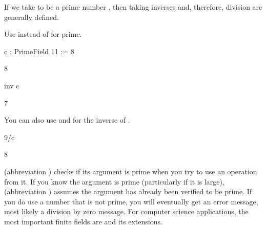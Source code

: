 {{{{{{{{{{{{{{{{If we take  to be a prime number ,
then taking inverses and, therefore, division are generally defined.
\begin{xtc}
\begin{xtccomment}
Use  instead of 
for  prime.
\end{xtccomment}
\begin{spadsrc}
c : PrimeField 11 := 8 
\end{spadsrc}
\begin{TeXOutput}
\begin{fricasmath}{6}
8%
\end{fricasmath}
\end{TeXOutput}
\end{xtc}
\begin{xtc}
\begin{xtccomment}
\end{xtccomment}
\begin{spadsrc}
inv c 
\end{spadsrc}
\begin{TeXOutput}
\begin{fricasmath}{7}
7%
\end{fricasmath}
\end{TeXOutput}
\end{xtc}
\begin{xtc}
\begin{xtccomment}
You can also use  and  for the inverse of
.
\end{xtccomment}
\begin{spadsrc}
9/c 
\end{spadsrc}
\begin{TeXOutput}
\begin{fricasmath}{8}
8%
\end{fricasmath}
\end{TeXOutput}
\end{xtc}

 (abbreviation ) checks if its
argument is prime when you try to use an operation from it.
If you know the argument is prime (particularly if it is large),
 (abbreviation ) assumes
the argument has already been verified to be prime.
If you do use a number that is not prime, you will eventually get
an error message, most likely a division by zero message.
For computer science applications, the most important finite fields
are  and its extensions.

}}}}}}}}}}}}}}}}
